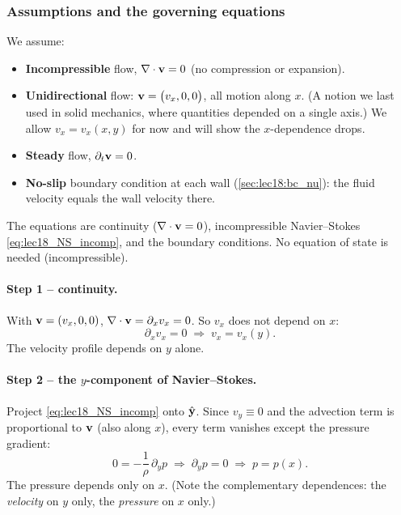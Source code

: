 \documentclass[../main.tex]{subfiles}
\begin{document}
\subsubsection*{Assumptions and the governing equations}
We assume:
\begin{itemize}
  \item \textbf{Incompressible} flow, $\nabla \cdot\mathbf{v}=0$ (no compression or expansion).
  \item \textbf{Unidirectional} flow: $\mathbf{v}=\big(v_x,0,0\big)$, all motion along $x$. (A notion we last used in solid mechanics, where quantities depended on a single axis.) We allow $v_x=v_x(x,y)$ for now and will show the $x$-dependence drops.
  \item \textbf{Steady} flow, $\partial_t\mathbf{v}=0$.
  \item \textbf{No-slip} boundary condition at each wall (\cref{sec:lec18:bc_nu}): the fluid velocity equals the wall velocity there.
\end{itemize}
The equations are continuity ($\nabla \cdot\mathbf{v}=0$), incompressible Navier--Stokes \eqref{eq:lec18_NS_incomp}, and the boundary conditions. No equation of state is needed (incompressible).

\paragraph{Step 1 -- continuity.} With $\mathbf{v}=(v_x,0,0)$, $\nabla \cdot\mathbf{v}=\partial_x v_x=0$. So $v_x$ does not depend on $x$:
\begin{equation}
  \partial_x v_x = 0 \;\Longrightarrow\; v_x = v_x(y).
  \label{eq:lec19_continuity}
\end{equation}
The velocity profile depends on $y$ alone.

\paragraph{Step 2 -- the $y$-component of Navier--Stokes.} Project \eqref{eq:lec18_NS_incomp} onto $\hat{\mathbf{y}}$. Since $v_y\equiv0$ and the advection term is proportional to $\mathbf{v}$ (also along $x$), every term vanishes except the pressure gradient:
\begin{equation}
  0 = -\frac{1}{\rho}\,\partial_y p \;\Longrightarrow\; \partial_y p=0
  \;\Longrightarrow\; p=p(x).
  \label{eq:lec19_ycomp}
\end{equation}
The pressure depends only on $x$. (Note the complementary dependences: the \emph{velocity} on $y$ only, the \emph{pressure} on $x$ only.)
\end{document}
